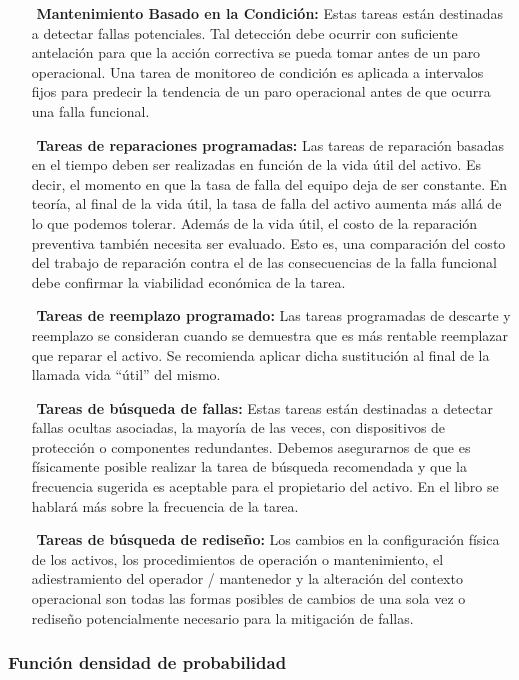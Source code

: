 \begin{itemize}
\item[$ $] \textbf{Mantenimiento Basado en la Condición:} Estas tareas están destinadas a detectar fallas potenciales. Tal detección debe ocurrir con suficiente antelación para que la acción correctiva se pueda tomar antes de un paro operacional. Una tarea de monitoreo de condición es aplicada a intervalos fijos para predecir la tendencia de un paro operacional antes de que ocurra una falla funcional.
\item[$ $] \textbf{Tareas de reparaciones programadas:} Las tareas de reparación basadas en el tiempo deben ser realizadas en función de la vida útil del activo. Es decir, el momento en que la tasa de falla del equipo deja de ser constante. En teoría, al final de la vida útil, la tasa de falla del activo aumenta más allá de lo que podemos tolerar. Además de la vida útil, el costo de la reparación preventiva también necesita ser evaluado. Esto es, una comparación del costo del trabajo de reparación contra el de las consecuencias de la falla funcional debe confirmar la viabilidad económica de la tarea.
\item[$ $] \textbf{Tareas de reemplazo programado:} Las tareas programadas de descarte y reemplazo se consideran cuando se demuestra que es más rentable reemplazar que reparar el activo. Se recomienda aplicar dicha sustitución al final de la llamada vida “útil” del mismo.
\item[$ $] \textbf{Tareas de búsqueda de fallas:} Estas tareas están destinadas a detectar fallas ocultas asociadas, la mayoría de las veces, con dispositivos de protección o componentes redundantes. Debemos asegurarnos de que es físicamente posible realizar la tarea de búsqueda recomendada y que la frecuencia sugerida es aceptable para el propietario del activo. En el libro se hablará más sobre la frecuencia de la tarea.
\item[$ $] \textbf{Tareas de búsqueda de rediseño:} Los cambios en la configuración física de los activos, los procedimientos de operación o mantenimiento, el adiestramiento del operador / mantenedor y la alteración del contexto operacional son todas las formas posibles de cambios de una sola vez o rediseño potencialmente necesario para la mitigación de fallas.

\end{itemize}

\subsubsection{Función densidad de probabilidad}


